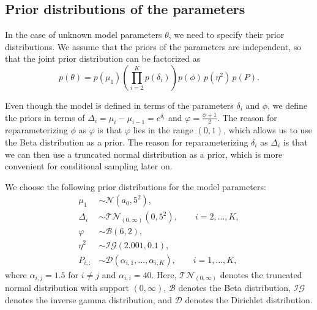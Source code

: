 \subsection{Prior distributions of the parameters}
\label{sec:priors}
In the case of unknown model parameters $\theta$, we need to specify their prior distributions. 
We assume that the priors of the parameters are independent, so that the joint prior distribution can be factorized as
\begin{equation}
    p(\theta) = p(\mu_1) \left(\prod_{i=2}^{K} p(\delta_i)\right) p(\phi)\, p(\eta^2)\, p(P).
\end{equation}

Even though the model is defined in terms of the parameters $\delta_i$ and $\phi$, we define the priors in terms of $\Delta_i = \mu_i - \mu_{i-1} = e^{\delta_i}$ and $\varphi = \frac{\phi + 1}{2}$. 
The reason for reparameterizing $\phi$ as $\varphi$ is that $\varphi$ lies in the range $(0, 1)$, which allows us to use the Beta distribution as a prior. 
The reason for reparameterizing $\delta_i$ as $\Delta_i$ is that we can then use a truncated normal distribution as a prior, which is more convenient for conditional sampling later on.  

We choose the following prior distributions for the model parameters:
\begin{align}
    \mu_1 &\sim \mathcal{N}(a_0,5^2),\\
    \Delta_i &\sim \mathcal{TN}_{(0,\infty)}(0,5^2), \qquad i=2,\ldots,K,\\
    \varphi &\sim \mathcal{B}(6,2),\\
    \eta^2 &\sim \mathcal{IG}(2.001,0.1),\\
    P_{i,:} &\sim \mathcal{D}(\alpha_{i,1},\ldots,\alpha_{i,K}), \qquad i=1,\ldots,K,
\end{align}
where $\alpha_{i,j}=1.5$ for $i\neq j$ and $\alpha_{i,i}=40$. Here, $\mathcal{TN}_{(0,\infty)}$ denotes the truncated normal distribution with support $(0,\infty)$, $\mathcal{B}$ denotes the Beta distribution, $\mathcal{IG}$ denotes the inverse gamma distribution, and $\mathcal{D}$ denotes the Dirichlet distribution.

